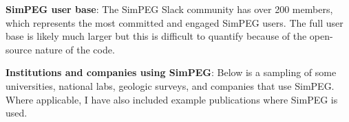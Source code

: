 \documentclass[a4paper, 11pt]{article}
\begin{document}
\textbf{SimPEG user base}: The SimPEG Slack community has over 200 members, which represents the most committed and engaged SimPEG users. The full user base is likely much larger but this is difficult to quantify because of the open-source nature of the code. \vspace{0.3cm}


\textbf{Institutions and companies using SimPEG}: Below is a sampling of some universities, national labs, geologic surveys, and companies that use SimPEG. Where applicable, I have also included example publications where SimPEG is used.
\end{document}
